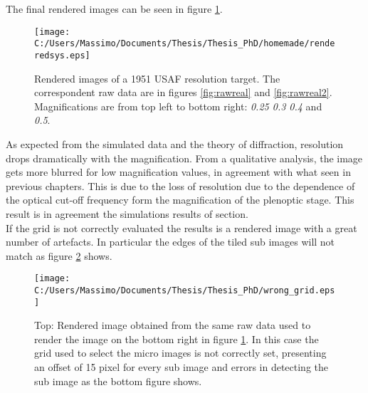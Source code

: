 The final rendered images can be seen in figure \ref{fig:renderingreal1}.
\\
\begin{figure}[H]
	\centering
	\texttt{[image: C:/Users/Massimo/Documents/Thesis/Thesis\_PhD/homemade/renderedsys.eps]}
	\caption{\label{fig:renderingreal1}Rendered images of a 1951 USAF resolution target. The correspondent raw data are in figures \ref{fig:rawreal} and \ref{fig:rawreal2}. Magnifications are from top left to bottom right: \textit{0.25 0.3 0.4} and \textit{0.5}. }
\end{figure}
As expected from the simulated data and the theory of diffraction, resolution drops dramatically with the magnification. From a qualitative analysis, the image gets more blurred for low magnification values, in agreement with what seen in previous chapters. This is due to the loss of resolution due to the dependence of the optical cut-off frequency form the magnification of the plenoptic stage. This result is in agreement the simulations results of section. \\
If the grid is not correctly evaluated the results is a rendered image with a great number of artefacts. In particular the edges of the tiled sub images will not match as figure \ref{fig:renderinwrong1} shows.
\begin{figure}[H]
	\centering
	\texttt{[image: C:/Users/Massimo/Documents/Thesis/Thesis\_PhD/wrong\_grid.eps]}
	\caption{\label{fig:renderinwrong1} Top: Rendered image obtained from the same raw data used to render the image on the bottom right in figure \ref{fig:renderingreal1}. In this case the grid used to select the micro images is not correctly set, presenting an offset of 15 pixel for every sub image and errors in detecting the sub image as the bottom figure shows.}
\end{figure}
